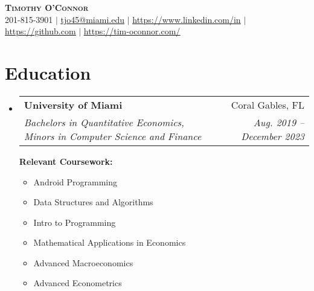 \documentclass[letterpaper,11pt]{article}
\makeatletter
\newcommand{\resumeSubheading}[4]{
  \vspace{-2pt}\item
    \begin{tabular*}{0.97\textwidth}[t]{l@{\extracolsep{\fill}}r}
      \textbf{#1} & #2 \\
      \textit{\small#3} & \textit{\small #4} \\
    \end{tabular*}\vspace{-7pt}
}
\newcommand{\resumeSubHeadingListStart}{\begin{itemize}[leftmargin=0.15in, label={}]}
\newcommand{\resumeSubHeadingListEnd}{\end{itemize}}
\makeatother
\begin{document}

\begin{center}
        \textbf{\Huge \scshape Timothy O'Connor} \\ \vspace{1pt}
        \small 201-815-3901 $|$ \href{mailto:x@x.com}{\underline{tjo45@miami.edu}} $|$ 
        \href{https://www.linkedin.com/in/timothy-o-connor-a17223198/...}{\underline{https://www.linkedin.com/in}} $|$
        \href{https://github.com/timoconnnor...}{\underline{https://github.com}} $|$
        \href{https://tim-oconnor.com/}{\underline{https://tim-oconnor.com/}}
    \end{center}


\section{Education}
  \resumeSubHeadingListStart
    \resumeSubheading
      {University of Miami}{Coral Gables, FL}
      {Bachelors in Quantitative Economics, Minors in Computer Science and Finance}{Aug. 2019 -- December 2023} 

    \vspace{10pt} %

    \textbf{Relevant Coursework:}
      \begin{multicols}{2}
        \begin{itemize}
          \item Android Programming
          \item Data Structures and Algorithms
          \item Intro to Programming
          \item Mathematical Applications in Economics
          \item Advanced Macroeconomics
          \item Advanced Econometrics
        \end{itemize}
      \end{multicols}
  \resumeSubHeadingListEnd
\end{document}
